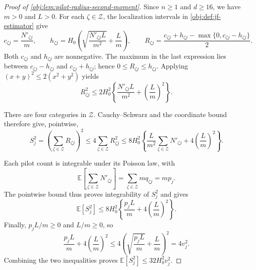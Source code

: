 \begin{proof}[Proof of \cref{obj:lem:pilot-radius-second-moment}]
Since \(n\geq1\) and \(d\geq16\), we have \(m>0\) and \(L>0\). For each \(\zeta\in\mathcal Z\), the localization intervals in \cref{obj:def:jf-estimator} give
\[
c_{\zeta j}=\frac{N'_{\zeta j}}m,\qquad
h_{\zeta j}
=H_0\left(\sqrt{\frac{N'_{\zeta j}L}{m^2}}+\frac Lm\right),\qquad
R_{\zeta j}
=\frac{c_{\zeta j}+h_{\zeta j}
-\max\{0,c_{\zeta j}-h_{\zeta j}\}}2.
\]
Both \(c_{\zeta j}\) and \(h_{\zeta j}\) are nonnegative. The maximum in the last expression lies between \(c_{\zeta j}-h_{\zeta j}\) and \(c_{\zeta j}+h_{\zeta j}\); hence \(0\leq R_{\zeta j}\leq h_{\zeta j}\). Applying \((x+y)^2\leq2(x^2+y^2)\) yields
\[
R_{\zeta j}^2
\leq 2H_0^2\left\{
\frac{N'_{\zeta j}L}{m^2}
+\left(\frac Lm\right)^2
\right\}.
\]

There are four categories in \(\mathcal Z\). Cauchy–Schwarz and the coordinate bound therefore give, pointwise,
\[
S_j^2
=\left(\sum_{\zeta\in\mathcal Z}R_{\zeta j}\right)^2
\leq4\sum_{\zeta\in\mathcal Z}R_{\zeta j}^2
\leq8H_0^2\left\{
\frac L{m^2}\sum_{\zeta\in\mathcal Z}N'_{\zeta j}
+4\left(\frac Lm\right)^2
\right\}.
\]

Each pilot count is integrable under its Poisson law, with
\[
\mathbb E\!\left[\sum_{\zeta\in\mathcal Z}N'_{\zeta j}\right]
=\sum_{\zeta\in\mathcal Z}m q_{\zeta j}
=mp_j.
\]
The pointwise bound thus proves integrability of \(S_j^2\) and gives
\[
\mathbb E[S_j^2]
\leq8H_0^2\left\{
\frac{p_jL}{m}+4\left(\frac Lm\right)^2
\right\}.
\]
Finally, \(p_jL/m\geq0\) and \(L/m\geq0\), so
\[
\frac{p_jL}{m}+4\left(\frac Lm\right)^2
\leq4\left(\sqrt{\frac{p_jL}{m}}+\frac Lm\right)^2
=4v_j^2.
\]
Combining the two inequalities proves \(\mathbb E[S_j^2]\leq32H_0^2v_j^2\).
\end{proof}
